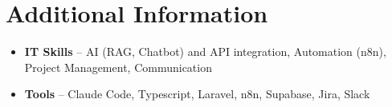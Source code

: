 \documentclass[a4paper,10pt]{article}
\begin{document}
\section{Additional Information}
\begin{itemize}
\item \textbf{IT Skills} -- AI (RAG, Chatbot) and API integration, Automation (n8n), Project Management, Communication
\item \textbf{Tools} -- Claude Code, Typescript, Laravel, n8n, Supabase, Jira, Slack
\end{itemize}
\end{document}
